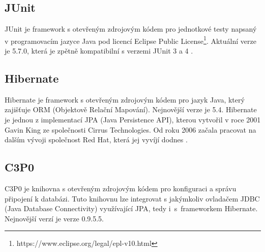 \subsection*{JUnit}

JUnit je framework s otevřeným zdrojovým kódem pro jednotkové testy napsaný v programovacím jazyce Java pod licencí Eclipse Public License\footnote{https://www.eclipse.org/legal/epl-v10.html}. Aktuální verze je 5.7.0, která je zpětně kompatibilní s verzemi JUnit 3 a 4 \cite{Technology_JUnit}.

\subsection*{Hibernate}

Hibernate je framework s otevřeným zdrojovým kódem pro jazyk Java, který zajišťuje ORM (Objektově Relační Mapování). Nejnovější verze je 5.4. Hibernate je jednou z implementací JPA (Java Persistence API), kterou vytvořil v roce 2001 Gavin King ze společnosti Cirrus Technologies. Od roku 2006 začala pracovat na dalším vývoji společnost Red Hat, která jej vyvíjí dodnes \cite{Technology_Hibernate}.

\subsection*{C3P0}
\label{subsection:technology_C3P0}

C3P0 je knihovna s otevřeným zdrojovým kódem pro konfiguraci a správu připojení k databázi. Tuto knihovnu lze integrovat s jakýmkoliv ovladačem JDBC (Java Database Connectivity) využívající JPA, tedy i~s~frameworkem Hibernate. Nejnovější verzí je verze 0.9.5.5. 



